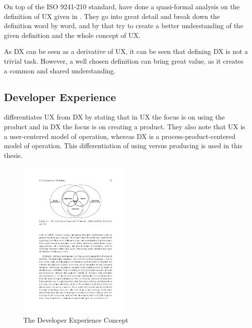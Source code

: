 \documentclass[english, 12pt, a4paper, sci, utf8, a-1b, online]{aaltothesis}
\begin{document}
On top of the ISO 9241-210 standard, \textcite{mirnig2015formal} have done a quasi-formal analysis on the definition of UX given in \textcite{iso-9241-210}. They go into great detail and break down the definition word by word, and by that try to create a better understanding of the given definition and the whole concept of UX.

As DX can be seen as a derivative of UX, it can be seen that defining DX is not a trivial task. However, a well chosen definition can bring great value, as it creates a common and shared understanding.

\subsection{Developer Experience}


\textcite[167]{moilanen2018api} differentiates UX from DX by stating that in UX the focus is on using the product and in DX the focus is on creating a product. They also note that UX is a user-centered model of operation, whereas DX is a process-product-centered model of operation. This differentiation of using versus producing is used in this thesis.

\begin{figure}[H]
  \begin{center}
    \includegraphics[width=0.5\textwidth]{dx-social-technical.pdf}
  \end{center}
  \captionsetup{width=0.5\textwidth}
  \caption{The Developer Experience Concept \parencite{fagerholm-doctoral-thesis}}
  \label{figure:social-technical}
\end{figure}
\end{document}
